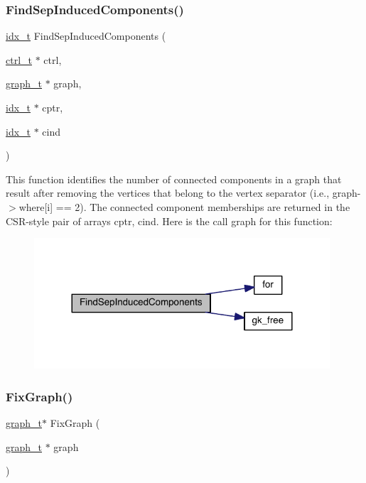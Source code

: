\subsubsection{\texorpdfstring{Find\+Sep\+Induced\+Components()}{FindSepInducedComponents()}}
{\footnotesize\ttfamily \hyperlink{a00876_aaa5262be3e700770163401acb0150f52}{idx\+\_\+t} Find\+Sep\+Induced\+Components (\begin{DoxyParamCaption}\item[{\hyperlink{a00742}{ctrl\+\_\+t} $\ast$}]{ctrl,  }\item[{\hyperlink{a00734}{graph\+\_\+t} $\ast$}]{graph,  }\item[{\hyperlink{a00876_aaa5262be3e700770163401acb0150f52}{idx\+\_\+t} $\ast$}]{cptr,  }\item[{\hyperlink{a00876_aaa5262be3e700770163401acb0150f52}{idx\+\_\+t} $\ast$}]{cind }\end{DoxyParamCaption})}

This function identifies the number of connected components in a graph that result after removing the vertices that belong to the vertex separator (i.\+e., graph-\/$>$where\mbox{[}i\mbox{]} == 2). The connected component memberships are returned in the C\+S\+R-\/style pair of arrays cptr, cind. Here is the call graph for this function\+:\nopagebreak
\begin{figure}[H]
\begin{center}
\leavevmode
\includegraphics[width=312pt]{a00945_a4f078e6f4dfe1e0fe00dd544dff52a21_cgraph}
\end{center}
\end{figure}
\mbox{\label{a00945_a681b2f4a615da39347c928c127760d07}} 
\subsubsection{\texorpdfstring{Fix\+Graph()}{FixGraph()}}
{\footnotesize\ttfamily \hyperlink{a00734}{graph\+\_\+t}$\ast$ Fix\+Graph (\begin{DoxyParamCaption}\item[{\hyperlink{a00734}{graph\+\_\+t} $\ast$}]{graph }\end{DoxyParamCaption})}

